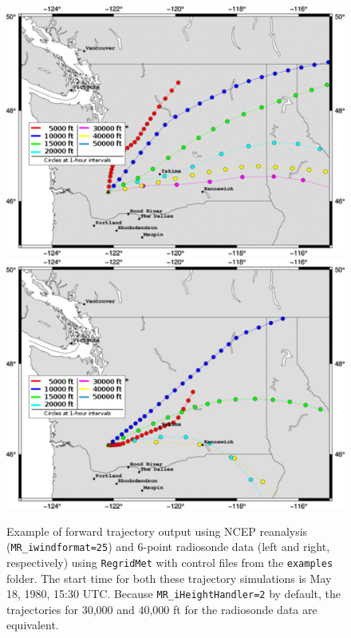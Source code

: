 \documentclass[11pt]{article}   %
\begin{document}
\begin{figure}[htbp]\begin{center}
 \includegraphics[angle=0,scale=0.3]{Figs/trajectory_NCEP.pdf}
 \includegraphics[angle=0,scale=0.3]{Figs/trajectory_Sonde.pdf}
 \parbox{15cm}{\caption{\label{FigTraj}
 Example of forward trajectory output using NCEP reanalysis (\texttt{MR\_iwindformat=25}) and
 6-point radiosonde data (left and right, respectively) using \texttt{RegridMet} with control files
 from the \texttt{examples} folder.  The start time for both these trajectory simulations is
 May 18, 1980, 15:30 UTC. Because \texttt{MR\_iHeightHandler=2} by default, the trajectories for 30,000
 and 40,000 ft for the radiosonde data are equivalent.
 }}
\end{center}\end{figure}
\end{document}
